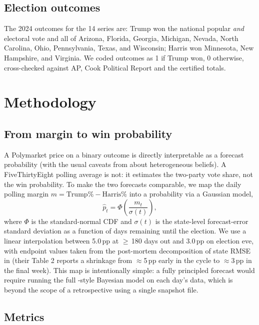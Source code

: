 \documentclass{article}
\begin{document}
\subsection{Election outcomes}
\label{sec:data-outcomes}

The 2024 outcomes for the 14 series are: Trump won the national popular
\emph{and} electoral vote and all of Arizona, Florida, Georgia, Michigan,
Nevada, North Carolina, Ohio, Pennsylvania, Texas, and Wisconsin; Harris
won Minnesota, New Hampshire, and Virginia. We coded outcomes as 1 if
Trump won, 0 otherwise, cross-checked against AP, Cook Political Report
and the certified totals.

\section{Methodology}
\label{sec:methods}

\subsection{From margin to win probability}

A Polymarket price on a binary outcome is directly interpretable as a
forecast probability (with the usual caveats from
\citet{manski2006interpreting} about heterogeneous beliefs). A
FiveThirtyEight polling average is not: it estimates the two-party vote
share, not the win probability. To make the two forecasts comparable, we
map the daily polling margin $m = \mathrm{Trump}\% - \mathrm{Harris}\%$
into a probability via a Gaussian model,
\[
\hat p_t = \Phi\!\left(\frac{m_t}{\sigma(t)}\right),
\]
where $\Phi$ is the standard-normal CDF and $\sigma(t)$ is the state-level
forecast-error standard deviation as a function of days remaining until
the election. We use a linear interpolation between 5.0\,pp at
$\geq$\,180 days out and 3.0\,pp on election eve, with endpoint values
taken from the post-mortem decomposition of state RMSE in
\citet{heidemanns2020updated} (their Table 2 reports a shrinkage from
$\approx$5\,pp early in the cycle to $\approx$3\,pp in the final week).
This map is intentionally simple: a fully principled forecast would
require running the full \citet{linzer2013dynamic}-style Bayesian model on
each day's data, which is beyond the scope of a retrospective using a
single snapshot file.

\subsection{Metrics}
\end{document}
